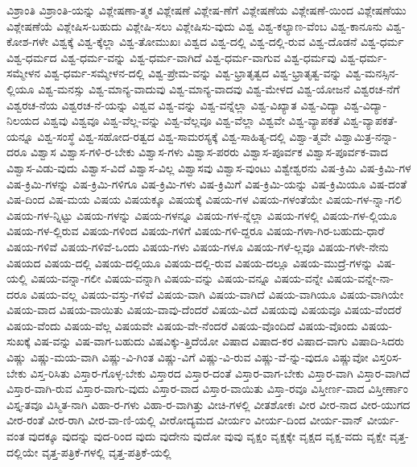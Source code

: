 {ವಿಶ್ರಾಂತಿ
ವಿಶ್ರಾಂತಿ-ಯನ್ನು
ವಿಶ್ಲೇಷಣಾ-ತ್ಮಕ
ವಿಶ್ಲೇಷಣೆ
ವಿಶ್ಲೇಷ-ಣೆಗೆ
ವಿಶ್ಲೇಷಣೆಯ
ವಿಶ್ಲೇಷಣೆ-ಯಿಂದ
ವಿಶ್ಲೇಷಣೆಯು
ವಿಶ್ಲೇಷಣೆಯೆ
ವಿಶ್ಲೇಷಿಸ-ಬಹುದು
ವಿಶ್ಲೇಷಿ-ಸಲು
ವಿಶ್ಲೇಷಿಸು-ವುದು
ವಿಶ್ವ
ವಿಶ್ವ-ಕಲ್ಯಾಣ-ವೆಂಬ
ವಿಶ್ವ-ಕಾನೂನು
ವಿಶ್ವ-ಕೋಶ-ಗಳೇ
ವಿಶ್ವಕ್ಕೆ
ವಿಶ್ವ-ಕ್ಕೆಲ್ಲಾ
ವಿಶ್ವ-ತೋಮುಖಃ
ವಿಶ್ವದ
ವಿಶ್ವ-ದಲ್ಲಿ
ವಿಶ್ವ-ದಲ್ಲಿ-ರುವ
ವಿಶ್ವ-ದೊಡನೆ
ವಿಶ್ವ-ಧರ್ಮ
ವಿಶ್ವ-ಧರ್ಮದ
ವಿಶ್ವ-ಧರ್ಮ-ವನ್ನು
ವಿಶ್ವ-ಧರ್ಮ-ವಾಗಿದೆ
ವಿಶ್ವ-ಧರ್ಮ-ವಾಗುವ
ವಿಶ್ವ-ಧರ್ಮವು
ವಿಶ್ವ-ಧರ್ಮ-ಸಮ್ಮೇಳನ
ವಿಶ್ವ-ಧರ್ಮ-ಸಮ್ಮೇಳನ-ದಲ್ಲಿ
ವಿಶ್ವ-ಪ್ರೇಮ-ವನ್ನು
ವಿಶ್ವ-ಭ್ರಾತೃತ್ವದ
ವಿಶ್ವ-ಭ್ರಾತೃತ್ವ-ವನ್ನು
ವಿಶ್ವ-ಮನಸ್ಸಿನ-ಲ್ಲಿಯೂ
ವಿಶ್ವ-ಮನಸ್ಸು
ವಿಶ್ವ-ಮಾನ್ಯ-ವಾದುವು
ವಿಶ್ವ-ಮಾನ್ಯ-ವಾದವು
ವಿಶ್ವ-ಮೇಳದ
ವಿಶ್ವ-ಯೋಜನೆ
ವಿಶ್ವರಚ-ನೆಗೆ
ವಿಶ್ವರಚ-ನೆಯ
ವಿಶ್ವರಚ-ನೆ-ಯನ್ನು
ವಿಶ್ವವ
ವಿಶ್ವ-ವನ್ನು
ವಿಶ್ವ-ವನ್ನೆಲ್ಲಾ
ವಿಶ್ವ-ವಿಖ್ಯಾತ
ವಿಶ್ವ-ವಿದ್ಯಾ
ವಿಶ್ವ-ವಿದ್ಯಾ-ನಿಲಯದ
ವಿಶ್ವವು
ವಿಶ್ವವೂ
ವಿಶ್ವ-ವೆಲ್ಲ-ವನ್ನು
ವಿಶ್ವ-ವೆಲ್ಲವೂ
ವಿಶ್ವ-ವೆಲ್ಲಾ
ವಿಶ್ವವೇ
ವಿಶ್ವ-ವ್ಯಾಪಕತೆ
ವಿಶ್ವ-ವ್ಯಾಪಕತೆ-ಯನ್ನೂ
ವಿಶ್ವ-ಸಂಸ್ಥೆ
ವಿಶ್ವ-ಸಹೋದ-ರತ್ವದ
ವಿಶ್ವ-ಸಾಮರಸ್ಯಕ್ಕೆ
ವಿಶ್ವ-ಸಾಹಿತ್ಯ-ದಲ್ಲಿ
ವಿಶ್ವಾ-ತ್ಮವೇ
ವಿಶ್ವಾಮಿತ್ರ-ನನ್ನಾ-ದರೂ
ವಿಶ್ವಾಸ
ವಿಶ್ವಾಸ-ಗಳಿ-ರ-ಬೇಕು
ವಿಶ್ವಾಸ-ಗಳು
ವಿಶ್ವಾಸ-ಪರರು
ವಿಶ್ವಾಸ-ಪೂರ್ವಕ
ವಿಶ್ವಾಸ-ಪೂರ್ವಕ-ವಾದ
ವಿಶ್ವಾಸ-ವಿಡು-ವುದು
ವಿಶ್ವಾಸ-ವಿದೆ
ವಿಶ್ವಾಸ-ವಿಲ್ಲ
ವಿಶ್ವಾಸವು
ವಿಶ್ವಾಸ-ವುಂಟು
ವಿಶ್ವೇಶ್ವರನು
ವಿಷ-ಕ್ರಿಮಿ
ವಿಷ-ಕ್ರಿಮಿ-ಗಳ
ವಿಷ-ಕ್ರಿಮಿ-ಗಳನ್ನು
ವಿಷ-ಕ್ರಿಮಿ-ಗಳಿಗೂ
ವಿಷ-ಕ್ರಿಮಿ-ಗಳು
ವಿಷ-ಕ್ರಿಮಿಗೆ
ವಿಷ-ಕ್ರಿಮಿ-ಯನ್ನು
ವಿಷ-ಕ್ರಿಮಿಯೂ
ವಿಷ-ದಂತೆ
ವಿಷ-ದಿಂದ
ವಿಷ-ಮಯ
ವಿಷಯ
ವಿಷಯಕ್ಕೂ
ವಿಷಯಕ್ಕೆ
ವಿಷಯ-ಗಳ
ವಿಷಯ-ಗಳಂತೆಯೇ
ವಿಷಯ-ಗಳ-ನ್ನಾ-ಗಲಿ
ವಿಷಯ-ಗಳ-ನ್ನಿಟ್ಟು
ವಿಷಯ-ಗಳನ್ನು
ವಿಷಯ-ಗಳನ್ನೂ
ವಿಷಯ-ಗಳ-ನ್ನೆಲ್ಲಾ
ವಿಷಯ-ಗಳಲ್ಲಿ
ವಿಷಯ-ಗಳ-ಲ್ಲಿಯೂ
ವಿಷಯ-ಗಳ-ಲ್ಲಿರುವ
ವಿಷಯ-ಗಳಿಂದ
ವಿಷಯ-ಗಳಿಗೆ
ವಿಷಯ-ಗಳಿ-ದ್ದರೂ
ವಿಷಯ-ಗಳಾ-ಗಿರ-ಬಹುದು-ಧಾರೆ
ವಿಷಯ-ಗಳಿವೆ
ವಿಷಯ-ಗಳಿವೆ-ಒಂದು
ವಿಷಯ-ಗಳು
ವಿಷಯ-ಗಳೂ
ವಿಷಯ-ಗಳೆ-ಲ್ಲವೂ
ವಿಷಯ-ಗಳೇ-ನೇನು
ವಿಷಯದ
ವಿಷಯ-ದಲ್ಲಿ
ವಿಷಯ-ದಲ್ಲಿಯೂ
ವಿಷಯ-ದಲ್ಲಿ-ರುವ
ವಿಷಯ-ದಲ್ಲೂ
ವಿಷಯ-ಮುದ್ರೆ-ಗಳನ್ನು
ವಿಷ-ಯಲ್ಲಿ
ವಿಷಯ-ವನ್ನಾ-ಗಲೀ
ವಿಷಯ-ವನ್ನಾಗಿ
ವಿಷಯ-ವನ್ನು
ವಿಷಯ-ವನ್ನೂ
ವಿಷಯ-ವನ್ನೇ
ವಿಷಯ-ವನ್ನೇ-ನಾ-ದರೂ
ವಿಷಯ-ವಲ್ಲ
ವಿಷಯ-ವಸ್ತು-ಗಳಿವೆ
ವಿಷಯ-ವಾಗಿ
ವಿಷಯ-ವಾಗಿದೆ
ವಿಷಯ-ವಾಗಿಯೂ
ವಿಷಯ-ವಾಗಿಯೇ
ವಿಷಯ-ವಾದ
ವಿಷಯ-ವಾಯಿತು
ವಿಷಯ-ವಾವು-ದೆಂದರೆ
ವಿಷಯ-ವಿದೆ
ವಿಷಯವು
ವಿಷಯವೂ
ವಿಷಯ-ವೆಂದರೆ
ವಿಷಯ-ವೆಂದು
ವಿಷಯ-ವೆಲ್ಲ
ವಿಷಯವೇ
ವಿಷಯ-ವೇ-ನೆಂದರೆ
ವಿಷಯ-ವೊಂದಿದೆ
ವಿಷಯ-ವೊಂದು
ವಿಷಯ-ಸುಖಕ್ಕೆ
ವಿಷ-ವನ್ನು
ವಿಷ-ವಾಗ-ಬಹುದು
ವಿಷವಿಕ್ಕು-ತ್ತಿದೆಯೋ
ವಿಷಾದ
ವಿಷಾದ-ಕರ
ವಿಷಾದ-ವಾಗು
ವಿಷಾದಿ-ಸಿದರು
ವಿಷ್ಣು
ವಿಷ್ಣು-ಮಯ-ವಾಗಿ
ವಿಷ್ಣು-ವಿ-ಗಿಂತ
ವಿಷ್ಣು-ವಿಗೆ
ವಿಷ್ಣು-ವಿ-ರುವ
ವಿಷ್ಣು-ವೆ-ನ್ನು-ವುದೂ
ವಿಷ್ಣುವೋ
ವಿಸ್ತರಿಸ-ಬೇಕು
ವಿಸ್ತ-ರಿಸಿತು
ವಿಸ್ತಾರ-ಗೊಳ್ಳ-ಬೇಕು
ವಿಸ್ತಾರದ
ವಿಸ್ತಾರ-ದಂತೆ
ವಿಸ್ತಾರ-ವಾಗ-ಬೇಕು
ವಿಸ್ತಾರ-ವಾಗಿ
ವಿಸ್ತಾರ-ವಾಗಿದೆ
ವಿಸ್ತಾರ-ವಾಗಿ-ರುವ
ವಿಸ್ತಾರ-ವಾಗು-ವುದು
ವಿಸ್ತಾರ-ವಾದ
ವಿಸ್ತಾರ-ವಾಯಿತು
ವಿಸ್ತಾ-ರವೂ
ವಿಸ್ತೀರ್ಣ-ವಾದ
ವಿಸ್ತೀರ್ಣಾಂ
ವಿಸ್ತೃ-ತವೂ
ವಿಸ್ಮಿತ-ನಾಗಿ
ವಿಹಾ-ರ-ಗಳು
ವಿಹಾ-ರ-ವಾಗಿತ್ತು
ವೀಚಿ-ಗಳಲ್ಲಿ
ವೀತಶೋಕಃ
ವೀರ
ವೀರ-ನಾದ
ವೀರ-ಯುಗದ
ವೀರ-ರಂತೆ
ವೀರ-ರಾಗಿ
ವೀರ-ವಾ-ಣಿ-ಯಲ್ಲಿ
ವೀರೋದ್ಯಮದ
ವೀರ್ಯಂ
ವೀರ್ಯ-ದಿಂದ
ವೀರ್ಯ-ವಾನ್
ವೀರ್ಯ-ವಂತ
ವುದಕ್ಕೂ
ವುದನ್ನು
ವುದ-ರಿಂದ
ವುದು
ವುದೇನು
ವುದೋ
ವುವು
ವೃಕ್ಷಂ
ವೃಕ್ಷಕ್ಕೇ
ವೃಕ್ಷದ
ವೃಕ್ಷ-ವದು
ವೃಕ್ಷೇ
ವೃತ್ತ-ದಲ್ಲಿಯೇ
ವೃತ್ತ-ಪತ್ರಿಕೆ-ಗಳಲ್ಲಿ
ವೃತ್ತ-ಪತ್ರಿಕೆ-ಯಲ್ಲಿ
}

